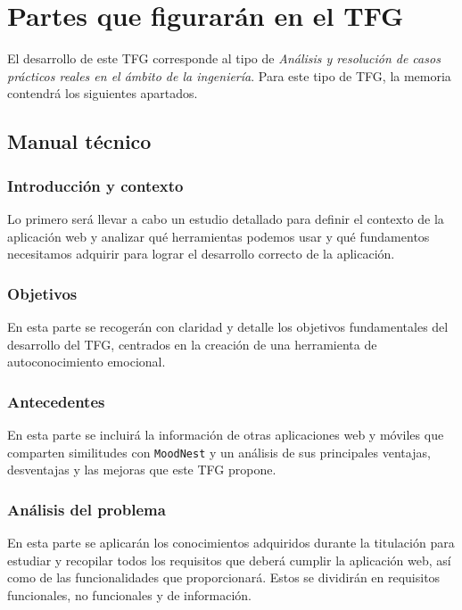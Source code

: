 \section{Partes que figurarán en el TFG}
\label{sec:partes}

El desarrollo de este TFG corresponde al tipo de \textit{Análisis y resolución de casos prácticos reales en el ámbito de la ingeniería}. Para este tipo de TFG, la memoria contendrá los siguientes apartados.

\vspace{-0.1cm}

\subsection{Manual técnico}

\vspace{-0.1cm}

\subsubsection{Introducción y contexto}
Lo primero será llevar a cabo un estudio detallado para definir el contexto de la aplicación web y analizar qué herramientas podemos usar y qué fundamentos necesitamos adquirir para lograr el desarrollo correcto de la aplicación.

\vspace{-0.1cm}

\subsubsection{Objetivos}
En esta parte se recogerán con claridad y detalle los objetivos fundamentales del desarrollo del TFG, centrados en la creación de una herramienta de autoconocimiento emocional.

\vspace{-0.1cm}

\subsubsection{Antecedentes}
En esta parte se incluirá la información de otras aplicaciones web y móviles que comparten similitudes con \texttt{MoodNest} y un análisis de sus principales ventajas, desventajas y las mejoras que este TFG propone.

\vspace{-0.1cm}

\subsubsection{Análisis del problema}
En esta parte se aplicarán los conocimientos adquiridos durante la titulación para estudiar y recopilar todos los requisitos que deberá cumplir la aplicación web, así como de las funcionalidades que proporcionará. Estos se dividirán en requisitos funcionales, no funcionales y de información.

